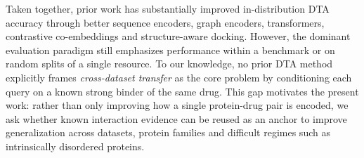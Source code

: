 Taken together, prior work has substantially improved in-distribution DTA accuracy through better sequence encoders, graph encoders, transformers, contrastive co-embeddings and structure-aware docking. However, the dominant evaluation paradigm still emphasizes performance within a benchmark or on random splits of a single resource. To our knowledge, no prior DTA method explicitly frames \emph{cross-dataset transfer} as the core problem by conditioning each query on a known strong binder of the same drug. This gap motivates the present work: rather than only improving how a single protein-drug pair is encoded, we ask whether known interaction evidence can be reused as an anchor to improve generalization across datasets, protein families and difficult regimes such as intrinsically disordered proteins.
